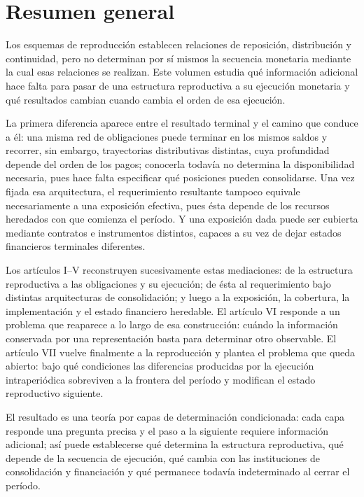 \documentclass[10pt,a5paper,twoside]{article}
\newcommand{\RBfronttitle}[1]{\phantomsection\addcontentsline{toc}{section}{#1}}
\begin{document}
\tableofcontents
\thispagestyle{empty}
\clearpage

\section*{Resumen general}\label{resumen-general}\RBfronttitle{Resumen general}

Los esquemas de reproducción establecen relaciones de reposición,
distribución y continuidad, pero no determinan por sí mismos la secuencia
monetaria mediante la cual esas relaciones se realizan. Este volumen estudia
qué información adicional hace falta para pasar de una estructura
reproductiva a su ejecución monetaria y qué resultados cambian cuando cambia
el orden de esa ejecución.

La primera diferencia aparece entre el resultado terminal y el camino que
conduce a él: una misma red de obligaciones puede terminar en los mismos
saldos y recorrer, sin embargo, trayectorias distributivas distintas, cuya
profundidad depende del orden de los pagos; conocerla todavía no determina la
disponibilidad necesaria, pues hace falta especificar qué posiciones pueden
consolidarse. Una vez fijada esa
arquitectura, el requerimiento resultante tampoco equivale necesariamente a
una exposición efectiva, pues ésta depende de los recursos heredados con que
comienza el período. Y una exposición dada puede ser cubierta mediante
contratos e instrumentos distintos, capaces a su vez de dejar estados
financieros terminales diferentes.

Los artículos I--V reconstruyen sucesivamente estas mediaciones: de la
estructura reproductiva a las obligaciones y su ejecución; de ésta al
requerimiento bajo distintas arquitecturas de consolidación; y luego a la
exposición, la cobertura, la implementación y el estado financiero heredable.
El artículo VI responde a un problema que reaparece a lo largo de esa
construcción: cuándo la información conservada por una representación basta
para determinar otro observable. El artículo VII vuelve finalmente a la
reproducción y plantea el problema que queda abierto: bajo qué condiciones las
diferencias producidas por la ejecución intraperiódica sobreviven a la
frontera del período y modifican el estado reproductivo siguiente.

El resultado es una teoría por capas de determinación condicionada: cada capa
responde una pregunta precisa y el paso a la siguiente requiere información
adicional; así puede establecerse qué determina la estructura reproductiva,
qué depende de la secuencia de ejecución, qué cambia con las instituciones de
consolidación y financiación y qué permanece todavía indeterminado al cerrar
el período.
\end{document}

